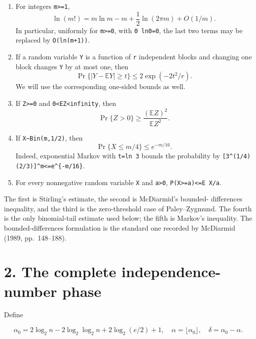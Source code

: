\documentclass[
  11pt,
  a4paper,
]{article}
\providecommand{\tightlist}{%
  \setlength{\itemsep}{0pt}\setlength{\parskip}{0pt}}
\begin{document}
\begin{enumerate}
\def\labelenumi{\arabic{enumi}.}
\tightlist
\item
  For integers \texttt{m\textgreater{}=1}, \[
   \ln(m!)=m\ln m-m+\frac12\ln(2\pi m)+O(1/m).          \tag{1.3}
  \] In particular, uniformly for \texttt{m\textgreater{}=0}, with
  \texttt{0\ ln0=0}, the last two terms may be replaced by
  \texttt{O(ln(m+1))}.
\item
  If a random variable \texttt{Y} is a function of \texttt{r}
  independent blocks and changing one block changes \texttt{Y} by at
  most one, then \[
   \Pr\{|Y-\mathbb EY|\ge t\}
   \le2\exp(-2t^2/r).                                    \tag{1.4}
  \] We will use the corresponding one-sided bounds as well.
\item
  If \texttt{Z\textgreater{}=0} and
  \texttt{0\textless{}EZ\textless{}infinity}, then \[
   \Pr\{Z>0\}\ge\frac{(\mathbb EZ)^2}{\mathbb EZ^2}.   \tag{1.5}
  \]
\item
  If \texttt{X\textasciitilde{}Bin(m,1/2)}, then \[
   \Pr\{X\le m/4\}\le e^{-m/16}.                       \tag{1.6}
  \] Indeed, exponential Markov with \texttt{t=ln\ 3} bounds the
  probability by
  \texttt{{[}3\^{}(1/}\allowbreak{}\texttt{4)}\allowbreak{}\texttt{(2/}\allowbreak{}\texttt{3)}\allowbreak{}\texttt{{]}}\allowbreak{}\texttt{\^{}m\textless{}}\allowbreak{}\texttt{=}\allowbreak{}\texttt{e\^{}\{-m/}\allowbreak{}\texttt{16\}}.
\item
  For every nonnegative random variable \texttt{X} and
  \texttt{a\textgreater{}0},
  \texttt{P(X\textgreater{}=a)\textless{}=E\ X/a}.
\end{enumerate}

The first is Stirling's estimate, the second is McDiarmid's bounded-
differences inequality, and the third is the zero-threshold case of
Paley--Zygmund. The fourth is the only binomial-tail estimate used
below; the fifth is Markov's inequality. The bounded-differences
formulation is the standard one recorded by McDiarmid (1989,
pp.~148--188).

\section{2. The complete independence-number
phase}\label{the-complete-independence-number-phase}

Define

\[
 \alpha_0=2\log_2n-2\log_2\log_2n
             +2\log_2(e/2)+1,
 \quad \alpha=\lfloor\alpha_0\rfloor,
 \quad \delta=\alpha_0-\alpha.                           \tag{2.1}
\]
\end{document}
